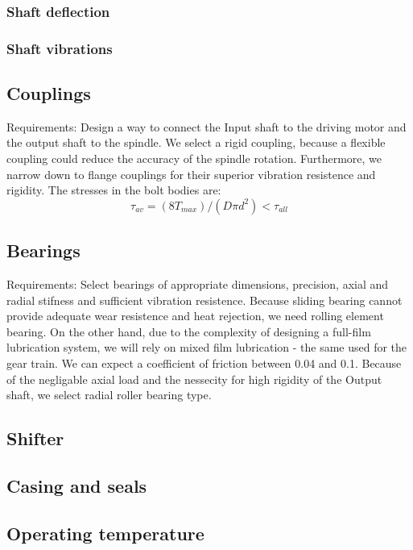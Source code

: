 \documentclass{article}
\begin{document}
\subsubsection{Shaft deflection}
\subsubsection{Shaft vibrations}
\FPeval{}
\vExample

\subsection{Couplings}
Requirements: Design a way to connect the Input shaft to the driving motor and the output shaft to the spindle.
We select a rigid coupling, because a flexible coupling could reduce the accuracy of the spindle rotation.
Furthermore, we narrow down to flange couplings for their superior vibration resistence and rigidity.
The stresses in the bolt bodies are:
$$\tau_{av} = (8 T_{max}) / (D \pi d^2) < \tau_{all}$$  %

\subsection{Bearings}
Requirements: Select bearings of appropriate dimensions, precision, axial and radial stifness and sufficient vibration resistence.
Because sliding bearing cannot provide adequate wear resistence and heat rejection, we need rolling element bearing.
On the other hand, due to the complexity of designing a full-film lubrication system, we will rely on mixed film lubrication - the same used for the gear train.
We can expect a coefficient of friction between 0.04 and 0.1.
Because of the negligable axial load and the nessecity for high rigidity of the Output shaft, we select radial roller bearing type.

\subsection{Shifter}
\subsection{Casing and seals}
\subsection{Operating temperature}
\end{document}

